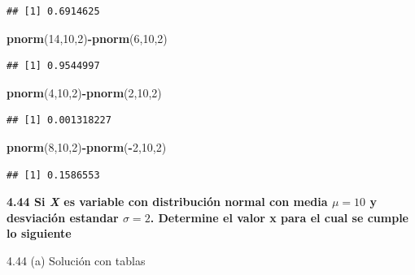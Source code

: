 \documentclass[
]{article}
\newenvironment{Shaded}{\begin{snugshade}}{\end{snugshade}}
\newcommand{\DecValTok}[1]{\textcolor[rgb]{0.00,0.00,0.81}{#1}}
\newcommand{\KeywordTok}[1]{\textcolor[rgb]{0.13,0.29,0.53}{\textbf{#1}}}
\newcommand{\NormalTok}[1]{#1}
\newcommand{\OperatorTok}[1]{\textcolor[rgb]{0.81,0.36,0.00}{\textbf{#1}}}
\begin{document}
\begin{verbatim}
## [1] 0.6914625
\end{verbatim}

\begin{Shaded}
\begin{Highlighting}[]
\KeywordTok{pnorm}\NormalTok{(}\DecValTok{14}\NormalTok{,}\DecValTok{10}\NormalTok{,}\DecValTok{2}\NormalTok{)}\OperatorTok{-}\KeywordTok{pnorm}\NormalTok{(}\DecValTok{6}\NormalTok{,}\DecValTok{10}\NormalTok{,}\DecValTok{2}\NormalTok{)}
\end{Highlighting}
\end{Shaded}

\begin{verbatim}
## [1] 0.9544997
\end{verbatim}

\begin{Shaded}
\begin{Highlighting}[]
\KeywordTok{pnorm}\NormalTok{(}\DecValTok{4}\NormalTok{,}\DecValTok{10}\NormalTok{,}\DecValTok{2}\NormalTok{)}\OperatorTok{-}\KeywordTok{pnorm}\NormalTok{(}\DecValTok{2}\NormalTok{,}\DecValTok{10}\NormalTok{,}\DecValTok{2}\NormalTok{)}
\end{Highlighting}
\end{Shaded}

\begin{verbatim}
## [1] 0.001318227
\end{verbatim}

\begin{Shaded}
\begin{Highlighting}[]
\KeywordTok{pnorm}\NormalTok{(}\DecValTok{8}\NormalTok{,}\DecValTok{10}\NormalTok{,}\DecValTok{2}\NormalTok{)}\OperatorTok{-}\KeywordTok{pnorm}\NormalTok{(}\OperatorTok{-}\DecValTok{2}\NormalTok{,}\DecValTok{10}\NormalTok{,}\DecValTok{2}\NormalTok{)}
\end{Highlighting}
\end{Shaded}

\begin{verbatim}
## [1] 0.1586553
\end{verbatim}

\textbf{4.44 Si \emph{X} es variable con distribución normal con media
\(\mu=10\) y desviación estandar \(\sigma=2\). Determine el valor x para
el cual se cumple lo siguiente}

4.44 (a) Solución con tablas
\end{document}
